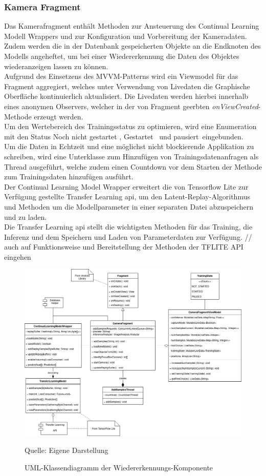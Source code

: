 \documentclass[oneside]{ausarbeitung}
\begin{document}
\subsubsection{Kamera Fragment}
Das Kamerafragment enthält Methoden zur Ansteuerung des Continual Learning Modell Wrappers und zur Konfiguration und Vorbereitung der Kameradaten. Zudem werden die in der Datenbank gespeicherten Objekte an die Endknoten des Modells angeheftet, um bei einer Wiedererkennung die Daten des Objektes wiederanzeigen lassen zu können.\\ 
Aufgrund des Einsetzens des MVVM-Patterns wird ein Viewmodel für das Fragment aggregiert, welches unter Verwendung von Livedaten die Graphische Oberfläche kontinuierlich aktualisiert. Die Livedaten werden hierbei innerhalb eines anonymen Observers, welcher in der von Fragment geerbten \glqq \textit{onViewCreated}\grqq-Methode erzeugt werden.\\
Um den Wertebereich des Trainingsstatus zu optimieren, wird eine Enumeration mit den Status \glqq Noch nicht gestartet \grqq, \glqq Gestartet \grqq\ und \glqq pausiert\grqq\ eingebunden.\\
Um die Daten in Echtzeit und eine möglichst nicht blockierende Applikation zu schreiben, wird eine Unterklasse zum Hinzufügen von Trainingsdatenanfragen als Thread ausgeführt, welche zudem einen Countdown vor dem Starten der Methode zum Trainingsdaten hinzufügen ausführt.\\
Der Continual Learning Model Wrapper erweitert die von Tensorflow Lite zur Verfügung gestellte Transfer Learning \ac{api}, um den Latent-Replay-Algorithmus und Methoden um die Modellparameter in einer separaten Datei abzuspeichern und zu laden.\\
Die Transfer Learning \ac{api} stellt die wichtigsten Methoden für das Training, die Inferenz und dem Speichern und Laden von Parameterdaten zur Verfügung.
// auch auf Funktionsweise und Bereitstellung der Methoden der TFLITE API eingehen

\begin{figure}[hptb]
	\centering
	\includegraphics[height=0.55\textheight]{images/camera-fragment-class-diagram.png}
	\caption{UML-Klassendiagramm der Wiedererkennungs-Komponente} Quelle: Eigene Darstellung
	\label{fig:recognition-classdiagram}
\end{figure}
\end{document}
